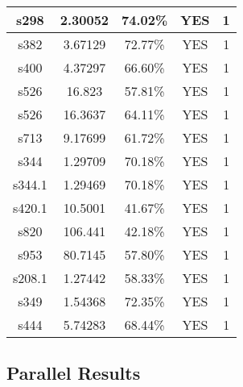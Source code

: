 \documentclass[a4paper,11pt]{article}
\begin{document}
\begin{center}
\begin{tabular}{||c c c c c||}
\hline
 s298 & 2.30052 & 74.02\% & YES  & 1 \\ 
\hline
 s382 & 3.67129 & 72.77\% & YES  & 1 \\ 
\hline
 s400 & 4.37297 & 66.60\% & YES  & 1 \\ 
\hline
 s526 & 16.823 & 57.81\% & YES  & 1 \\ 
\hline
 s526 & 16.3637 & 64.11\% & YES  & 1 \\ 
\hline
 s713 & 9.17699 & 61.72\% & YES  & 1 \\ 
\hline
 s344 & 1.29709 & 70.18\% & YES  & 1 \\ 
\hline
 s344.1 & 1.29469 & 70.18\% & YES  & 1 \\ 
\hline
 s420.1 & 10.5001 & 41.67\% & YES  & 1 \\ 
\hline
 s820 & 106.441 & 42.18\% & YES  & 1 \\ 
\hline
 s953 & 80.7145 & 57.80\% & YES  & 1 \\ 
\hline
 s208.1 & 1.27442 & 58.33\% & YES  & 1 \\ 
\hline
 s349 & 1.54368 & 72.35\% & YES  & 1 \\ 
\hline
 s444 & 5.74283 & 68.44\% & YES  & 1 \\ 
\hline
\end{tabular}
\end{center}

\subsection*{Parallel Results}
\end{document}
